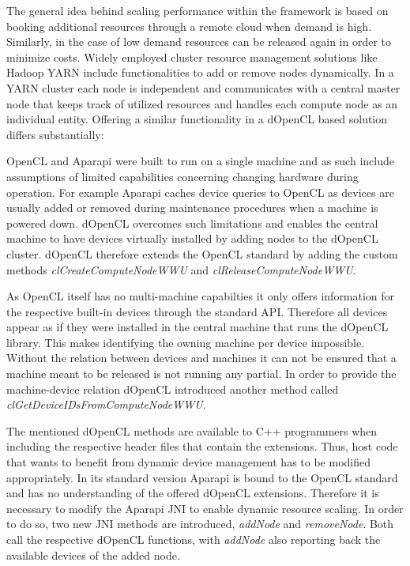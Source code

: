 The general idea behind scaling performance within the framework is based on booking additional resources through a remote cloud when demand is high. Similarly, in the case of low demand resources can be released again in order to minimize costs. Widely employed cluster resource management solutions like Hadoop YARN include functionalities to add or remove nodes dynamically. In a YARN cluster each node is independent and communicates with a central master node that keeps track of utilized resources and handles each compute node as an individual entity. Offering a similar functionality in a dOpenCL based solution differs substantially:

OpenCL and Aparapi were built to run on a single machine and as such include assumptions of limited capabilities concerning changing hardware during operation. For example Aparapi caches device queries to OpenCL as devices are usually added or removed during maintenance procedures when a machine is powered down. dOpenCL overcomes such limitations and enables the central machine to have devices virtually installed by adding nodes to the dOpenCL cluster. dOpenCL therefore extends the OpenCL standard by adding the custom methods \textit{clCreateComputeNodeWWU} and \textit{clReleaseComputeNodeWWU}. 

As OpenCL itself has no multi-machine capabilties it only offers information for the respective built-in devices through the standard API. Therefore all devices appear as if they were installed in the central machine that runs the dOpenCL library. This makes identifying the owning machine per device impossible. Without the relation between devices and machines it can not be ensured that a machine meant to be released is not running any partial. In order to provide the machine-device relation dOpenCL introduced another method called \textit{clGetDeviceIDsFromComputeNodeWWU}.

The mentioned dOpenCL methods are available to C++ programmers when including the respective header files that contain the extensions. Thus, host code that wants to benefit from dynamic device management has to be modified appropriately. In its standard version Aparapi is bound to the OpenCL standard and has no understanding of the offered dOpenCL extensions. Therefore it is necessary to modify the Aparapi JNI to enable dynamic resource scaling. In order to do so, two new JNI methods are introduced, \textit{addNode} and \textit{removeNode}. Both call the respective dOpenCL functions, with \textit{addNode} also reporting back the available devices of the added node.

